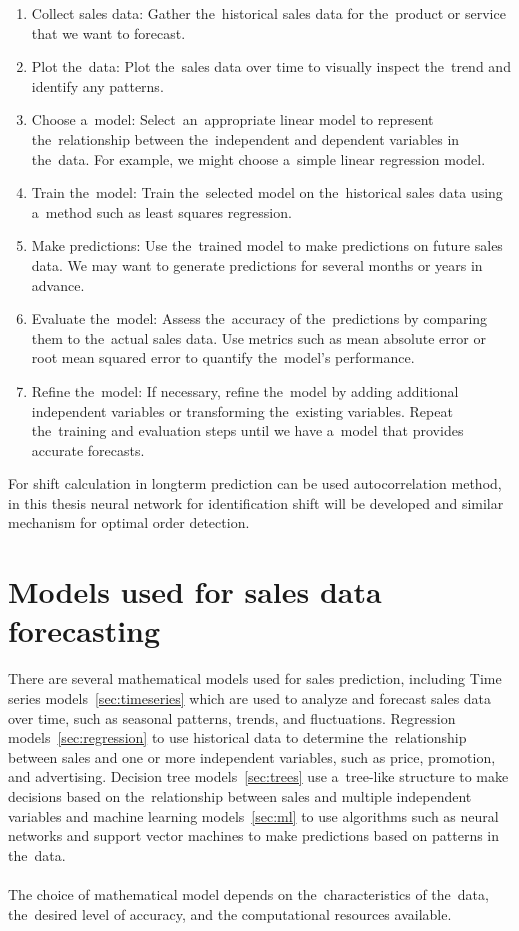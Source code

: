 \begin{enumerate}
    \item Collect sales data: Gather the~historical sales data for the~product or service that we want to forecast.
    \item Plot the~data: Plot the~sales data over time to visually inspect the~trend and identify any patterns.
    \item Choose a~model: Select~an~appropriate linear model to represent the~relationship between the~independent and
    dependent variables in the~data. For example, we might choose a~simple linear regression model.
    \item Train the~model: Train the~selected model on the~historical sales data using a~method such as least squares
    regression.
    \item Make predictions: Use the~trained model to make predictions on future sales data. We may want to generate
    predictions for several months or years in advance.
    \item Evaluate the~model: Assess the~accuracy of the~predictions by comparing them to the~actual sales data.
    Use metrics such as mean absolute error or root mean squared error to quantify the~model's performance.
    \item Refine the~model: If necessary, refine the~model by adding additional independent variables or
    transforming the~existing variables. Repeat the~training and evaluation steps until we have a~model that
    provides accurate forecasts.
\end{enumerate}
For shift calculation in longterm prediction can be used autocorrelation method, in this thesis neural network for
identification shift will be developed and similar mechanism for optimal order detection.

\section{Models used for sales data forecasting}\label{sec:models}
There are several mathematical models used for sales prediction, including Time series models~\ref{sec:timeseries} which are used to analyze and forecast sales data over time, such as seasonal patterns, trends, and fluctuations. Regression models~\ref{sec:regression} to use historical data to determine the~relationship between sales and one or more independent variables, such as price, promotion, and advertising. Decision tree models~\ref{sec:trees} use a~tree-like structure to make decisions based on the~relationship between sales and multiple independent variables and machine learning models~\ref{sec:ml} to use algorithms such as neural networks and support vector machines to make predictions based on patterns in the~data. \\
\\
The choice of mathematical model depends on the~characteristics of the~data, the~desired level of accuracy, and the
computational resources available.
\\

